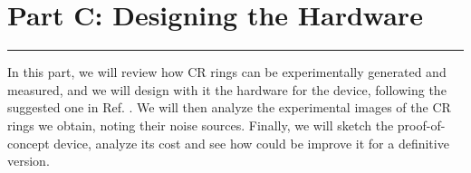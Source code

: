 \documentclass[11pt, a4paper, twoside]{article} %
\begin{document}
\newpage
\fancyhead[L]{\null}
\fancyhead[R]{\null}
%


\section*{\centering \huge{Part C: Designing the Hardware}\vspace{-0.3cm}}
\noindent\rule{\textwidth}{0.4pt}

In this part, we will review how CR rings can be experimentally generated and measured, and we will design with it the hardware for the device, following the suggested one in Ref. \cite{incomplete}. We will then analyze the experimental images of the CR rings we obtain, noting their noise sources. Finally, we will sketch the proof-of-concept device, analyze its cost and see how could be improve it for a definitive version.
\end{document}
